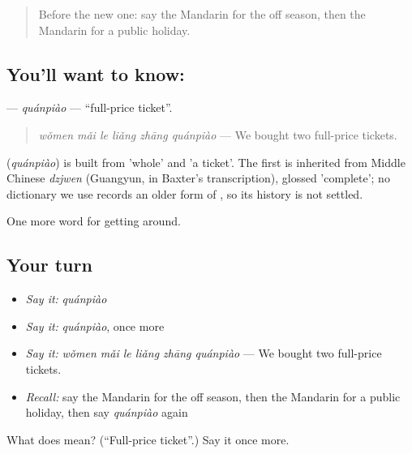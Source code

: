 \begin{quote}
Before the new one: say the Mandarin for the off season, then the Mandarin for a public holiday.
\end{quote}

\subsection*{You'll want to know: }
\textbf{} — \emph{quánpiào} — \textquotedblleft{}full-price ticket\textquotedblright{}.

\begin{quote}
\emph{wǒmen mǎi le liǎng zhāng quánpiào} — We bought two full-price tickets.
\end{quote}

\begin{cousinweb}
\textbf{} (\emph{quánpiào}) is built from  'whole' and  'a ticket'. The first is inherited from Middle Chinese \emph{dzjwen} (Guangyun, in Baxter's transcription), glossed 'complete'; no dictionary we use records an older form of , so its history is not settled.
\end{cousinweb}

\begin{grammarlens}[title={What you've built}]
One more word for getting around.
\end{grammarlens}

\subsection*{Your turn}
\begin{itemize}
\raggedright
  \item \emph{Say it:} \emph{quánpiào}
  \item \emph{Say it:} \emph{quánpiào}, once more
  \item \emph{Say it:} \emph{wǒmen mǎi le liǎng zhāng quánpiào} — We bought two full-price tickets.
  \item \emph{Recall:} say the Mandarin for the off season, then the Mandarin for a public holiday, then say \emph{quánpiào} again
\end{itemize}

\begin{tcolorbox}[breakable,colback=teal!4,colframe=teal!35!black,title={Before you move on}]
What does  mean? (\textquotedblleft{}Full-price ticket\textquotedblright{}.) Say it once more.
\end{tcolorbox}
